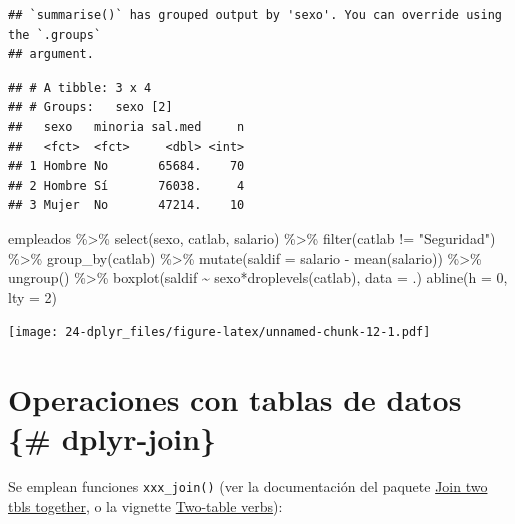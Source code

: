 \documentclass[
]{book}
\newenvironment{Shaded}{\begin{snugshade}}{\end{snugshade}}
\newcommand{\AttributeTok}[1]{\textcolor[rgb]{0.77,0.63,0.00}{#1}}
\newcommand{\DecValTok}[1]{\textcolor[rgb]{0.00,0.00,0.81}{#1}}
\newcommand{\FunctionTok}[1]{\textcolor[rgb]{0.00,0.00,0.00}{#1}}
\newcommand{\NormalTok}[1]{#1}
\newcommand{\SpecialCharTok}[1]{\textcolor[rgb]{0.00,0.00,0.00}{#1}}
\newcommand{\StringTok}[1]{\textcolor[rgb]{0.31,0.60,0.02}{#1}}
\theoremstyle{break}
\theoremstyle{nonumberplain}
\begin{document}
\begin{verbatim}
## `summarise()` has grouped output by 'sexo'. You can override using the `.groups`
## argument.
\end{verbatim}

\begin{verbatim}
## # A tibble: 3 x 4
## # Groups:   sexo [2]
##   sexo   minoria sal.med     n
##   <fct>  <fct>     <dbl> <int>
## 1 Hombre No       65684.    70
## 2 Hombre Sí       76038.     4
## 3 Mujer  No       47214.    10
\end{verbatim}

\begin{Shaded}
\begin{Highlighting}[]
\NormalTok{empleados }\SpecialCharTok{\%\textgreater{}\%} \FunctionTok{select}\NormalTok{(sexo, catlab, salario) }\SpecialCharTok{\%\textgreater{}\%}
          \FunctionTok{filter}\NormalTok{(catlab }\SpecialCharTok{!=} \StringTok{"Seguridad"}\NormalTok{) }\SpecialCharTok{\%\textgreater{}\%}
          \FunctionTok{group\_by}\NormalTok{(catlab) }\SpecialCharTok{\%\textgreater{}\%}
          \FunctionTok{mutate}\NormalTok{(}\AttributeTok{saldif =}\NormalTok{ salario }\SpecialCharTok{{-}} \FunctionTok{mean}\NormalTok{(salario)) }\SpecialCharTok{\%\textgreater{}\%}
          \FunctionTok{ungroup}\NormalTok{() }\SpecialCharTok{\%\textgreater{}\%}
          \FunctionTok{boxplot}\NormalTok{(saldif }\SpecialCharTok{\textasciitilde{}}\NormalTok{ sexo}\SpecialCharTok{*}\FunctionTok{droplevels}\NormalTok{(catlab), }\AttributeTok{data =}\NormalTok{ .)}
\FunctionTok{abline}\NormalTok{(}\AttributeTok{h =} \DecValTok{0}\NormalTok{, }\AttributeTok{lty =} \DecValTok{2}\NormalTok{)}
\end{Highlighting}
\end{Shaded}

\texttt{[image: 24-dplyr\_files/figure-latex/unnamed-chunk-12-1.pdf]}

\hypertarget{operaciones-con-tablas-de-datos-dplyr-join}{%
\section{Operaciones con tablas de datos \{\# dplyr-join\}}\label{operaciones-con-tablas-de-datos-dplyr-join}}

Se emplean funciones \texttt{xxx\_join()} (ver la documentación del paquete
\href{https://dplyr.tidyverse.org/reference/join.html}{Join two tbls together},
o la vignette \href{https://dplyr.tidyverse.org/articles/two-table.html}{Two-table verbs}):
\end{document}

